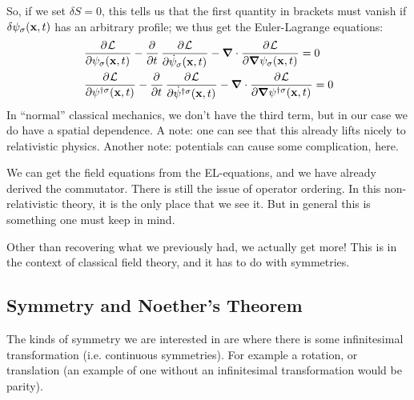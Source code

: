 So, if we set $\delta S = 0$, this tells us that the first quantity in brackets must vanish if $\delta \psi_\sigma(\mathbf{x}, t)$ has an arbitrary profile; we thus get the Euler-Lagrange equations:
\begin{equation}
    \begin{split}
        &\dpd{\L}{\psi_\sigma(\v{x}, t)} - \dpd{}{t}\dpd{\L}{\dot{\psi}_\sigma(\v{x}, t)} - \nabla \cdot \dpd{\L}{\nabla \psi_\sigma(\v{x}, t)} = 0
        \\ &\dpd{\L}{\psi^{\dag\sigma}(\v{x}, t)} - \dpd{}{t}\dpd{\L}{\dot{\psi}^{\dag\sigma}(\v{x}, t)} - \nabla \cdot \dpd{\L}{\nabla \psi^{\dag\sigma}(\v{x}, t)} = 0
    \end{split}
\end{equation}
In ``normal'' classical mechanics, we don't have the third term, but in our case we do have a spatial dependence. A note: one can see that this already lifts nicely to relativistic physics. Another note: potentials can cause some complication, here.

We can get the field equations from the EL-equations, and we have already derived the commutator. There is still the issue of operator ordering. In this non-relativistic theory, it is the only place that we see it. But in general this is something one must keep in mind.

Other than recovering what we previously had, we actually get more! This is in the context of classical field theory, and it has to do with symmetries. 

\subsection{Symmetry and Noether's Theorem}
The kinds of symmetry we are interested in are where there is some infinitesimal transformation (i.e. continuous symmetries). For example a rotation, or translation (an example of one without an infinitesimal transformation would be parity).

